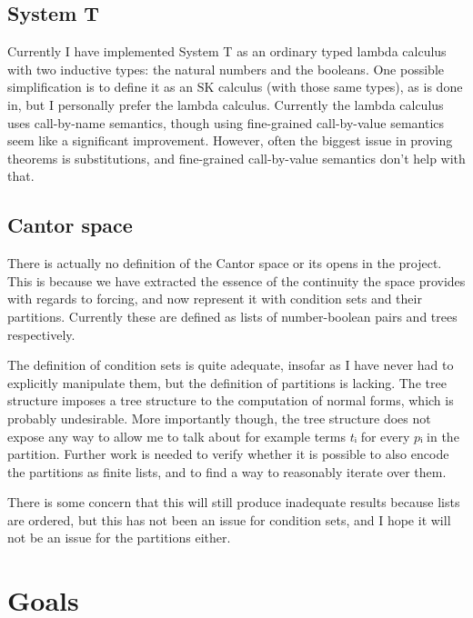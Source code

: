\documentclass{article}
\begin{document}
\subsection{System T}
Currently I have implemented System T as an ordinary typed lambda calculus with
two inductive types: the natural numbers and the booleans. One possible
simplification is to define it as an \(\mathrm{SK}\) calculus (with those same
types), as is done in\cite{dialogue}, but I personally prefer the lambda
calculus.
Currently the lambda calculus uses call-by-name semantics, though using
fine-grained call-by-value semantics seem like a significant improvement.
However, often the biggest issue in proving theorems is substitutions, and
fine-grained call-by-value semantics don't help with that.

\subsection{Cantor space}
There is actually no definition of the Cantor space or its opens in the project.
This is because we have extracted the essence of the continuity the space
provides with regards to forcing, and now represent it with condition sets and
their partitions. Currently these are defined as lists of number-boolean pairs
and trees respectively.

The definition of condition sets is quite adequate, insofar as I have never had
to explicitly manipulate them, but the definition of partitions is lacking. The
tree structure imposes a tree structure to the computation of normal forms,
which is probably undesirable. More importantly though, the tree structure does
not expose any way to allow me to talk about for example terms \(tᵢ\) for every
\(pᵢ\) in the partition. Further work is needed to verify whether it is possible
to also encode the partitions as finite lists, and to find a way to reasonably
iterate over them.

There is some concern that this will still produce inadequate results because
lists are ordered, but this has not been an issue for condition sets, and I hope
it will not be an issue for the partitions either.

\section{Goals}
\end{document}
